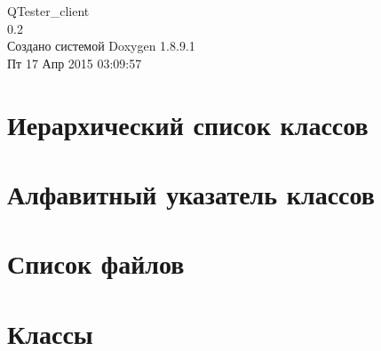 \documentclass[twoside]{book}
\newcommand{\+}{\discretionary{\mbox{\scriptsize$\hookleftarrow$}}{}{}}
\newcommand{\clearemptydoublepage}{%
  \newpage{\pagestyle{empty}\cleardoublepage}%
}
\begin{document}
\hypersetup{pageanchor=false,
             bookmarks=true,
             bookmarksnumbered=true,
             pdfencoding=unicode
            }
\begin{titlepage}
\vspace*{7cm}
\begin{center}%
{\Large Q\+Tester\+\_\+client \\[1ex]\large 0.\+2 }\\
\vspace*{1cm}
{\large Создано системой Doxygen 1.8.9.1}\\
\vspace*{0.5cm}
{\small Пт 17 Апр 2015 03:09:57}\\
\end{center}
\end{titlepage}
\clearemptydoublepage
\tableofcontents
\clearemptydoublepage
{}
\hypersetup{pageanchor=true}

\chapter{Иерархический список классов}

\chapter{Алфавитный указатель классов}

\chapter{Список файлов}

\chapter{Классы}














\end{document}
